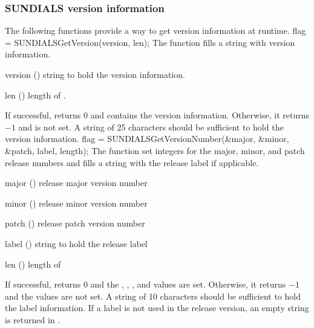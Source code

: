 
\subsubsection{SUNDIALS version information} \label{sss:sunversioninfo}

The following functions provide a way to get {\sundials} version
information at runtime.
{
  flag = SUNDIALSGetVersion(version, len);
}
{
  The function  fills a string with {\sundials}
  version information.
}
{
  \begin{args}[version]
  \item[version] () string to hold the {\sundials} version information.
  \item[len]     ()    length of .
  \end{args}
}
{
  If successful,  returns 0 and
   contains the {\sundials} version
  information. Otherwise, it returns $-1$ and  is not
  set.
}
{
  A string of 25 characters should be sufficient to hold the version information.
}
{
  flag = SUNDIALSGetVersionNumber(\&major, \&minor, \&patch, label, length);
}
{
  The function  set integers for the
  {\sundials} major, minor, and patch release numbers and fills a
  string with the release label if applicable.
}
{
  \begin{args}[length]
  \item[major] ()    {\sundials} release major version number
  \item[minor] ()    {\sundials} release minor version number
  \item[patch] ()    {\sundials} release patch version number
  \item[label] () string to hold the {\sundials} release label
  \item[len]   ()    length of 
  \end{args}
}
{
  If successful,  returns 0 and the
  , , , and  values are
  set. Otherwise, it returns $-1$ and the values are not set.
}
{
  A string of 10 characters should be sufficient to hold the label
  information. If a label is not used in the release version, an empty
  string is returned in .
}

